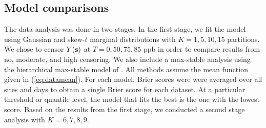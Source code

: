 \documentclass[11pt]{article}
\begin{document}
\subsection{Model comparisons}
The data analysis was done in two stages.
In the first stage, we fit the model using Gaussian and skew-$t$ marginal distributions with $K=1, 5, 10, 15$ partitions.
We chose to censor $Y(\mbox{\bf s})$ at $T = 0, 50, 75, 85$ ppb in order to compare results from no, moderate, and high censoring.
We also include a max-stable analysis using the hierarchical max-stable model of \citet{Reich2012}.
All methods assume the mean function given in (\ref{eq:datamean}).
For each model, Brier scores were were averaged over all sites and days to obtain a single Brier score for each dataset.
At a particular threshold or quantile level, the model that fits the best is the one with the lowest score.
Based on the results from the first stage, we conducted a second stage analysis with $K = 6, 7, 8, 9$.
\end{document}
